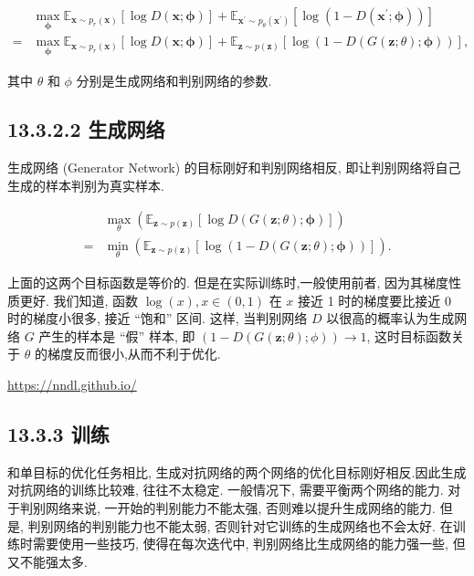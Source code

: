\documentclass[10pt]{article}
\begin{document}
\begin{align*}
& \max _{\boldsymbol{\phi}} \mathbb{E}_{\boldsymbol{x} \sim p_{r}(\boldsymbol{x})}[\log D(\boldsymbol{x} ; \boldsymbol{\phi})]+\mathbb{E}_{\boldsymbol{x}^{\prime} \sim p_{\theta}\left(\boldsymbol{x}^{\prime}\right)}\left[\log \left(1-D\left(\boldsymbol{x}^{\prime} ; \boldsymbol{\phi}\right)\right)\right]  \tag{13.31}\\
= & \max _{\boldsymbol{\phi}} \mathbb{E}_{\boldsymbol{x} \sim p_{r}(\boldsymbol{x})}[\log D(\boldsymbol{x} ; \boldsymbol{\phi})]+\mathbb{E}_{\boldsymbol{z} \sim p(\boldsymbol{z})}[\log (1-D(G(\boldsymbol{z} ; \theta) ; \boldsymbol{\phi}))], \tag{13.32}
\end{align*}


其中 $\theta$ 和 $\phi$ 分别是生成网络和判别网络的参数.

\subsection*{13.3.2.2 生成网络}
生成网络 (Generator Network) 的目标刚好和判别网络相反, 即让判别网络将自己生成的样本判别为真实样本.


\begin{align*}
& \max _{\theta}\left(\mathbb{E}_{\boldsymbol{z} \sim p(\boldsymbol{z})}[\log D(G(\boldsymbol{z} ; \theta) ; \boldsymbol{\phi})]\right)  \tag{13.33}\\
= & \min _{\theta}\left(\mathbb{E}_{\boldsymbol{z} \sim p(\boldsymbol{z})}[\log (1-D(G(\boldsymbol{z} ; \theta) ; \boldsymbol{\phi}))]\right) . \tag{13.34}
\end{align*}


上面的这两个目标函数是等价的. 但是在实际训练时,一般使用前者, 因为其梯度性质更好. 我们知道, 函数 $\log (x), x \in(0,1)$ 在 $x$ 接近 1 时的梯度要比接近 0 时的梯度小很多, 接近 “饱和” 区间. 这样, 当判别网络 $D$ 以很高的概率认为生成网络 $G$ 产生的样本是 “假” 样本, 即 $(1-D(G(\boldsymbol{z} ; \theta) ; \phi)) \rightarrow 1$, 这时目标函数关于 $\theta$ 的梯度反而很小,从而不利于优化.

\href{https://nndl.github.io/}{https://nndl.github.io/}

\subsection*{13.3.3 训练}
和单目标的优化任务相比, 生成对抗网络的两个网络的优化目标刚好相反.因此生成对抗网络的训练比较难, 往往不太稳定. 一般情况下, 需要平衡两个网络的能力. 对于判别网络来说, 一开始的判别能力不能太强, 否则难以提升生成网络的能力. 但是, 判别网络的判别能力也不能太弱, 否则针对它训练的生成网络也不会太好. 在训练时需要使用一些技巧, 使得在每次迭代中, 判别网络比生成网络的能力强一些, 但又不能强太多.
\end{document}
